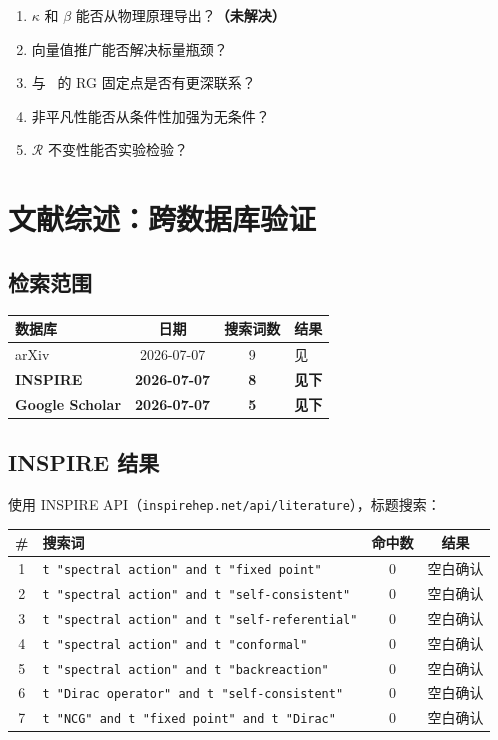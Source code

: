 \documentclass[11pt,a4paper]{ctexart}
\theoremstyle{remark}
\newcommand{\R}{\mathcal{R}}
\begin{document}
\begin{enumerate}
  \item $\kappa$ 和 $\beta$ 能否从物理原理导出？\textbf{（未解决）}
  \item 向量值推广能否解决标量瓶颈？
  \item 与~\cite{Per20} 的 RG 固定点是否有更深联系？
  \item 非平凡性能否从条件性加强为无条件？
  \item $\R$ 不变性能否实验检验？
\end{enumerate}

\section{文献综述：跨数据库验证}

\subsection{检索范围}

\begin{table}[h]
\centering
\begin{tabular}{lccl}
\toprule
数据库 & 日期 & 搜索词数 & 结果 \\
\midrule
arXiv & 2026-07-07 & 9 & 见~\cite{Phase1Report} \\
\textbf{INSPIRE} & \textbf{2026-07-07} & \textbf{8} & \textbf{见下} \\
\textbf{Google Scholar} & \textbf{2026-07-07} & \textbf{5} & \textbf{见下} \\
\bottomrule
\end{tabular}
\end{table}

\subsection{INSPIRE 结果}

使用 INSPIRE API（\texttt{inspirehep.net/api/literature}），标题搜索：

\begin{table}[h]
\centering
\begin{tabular}{clcc}
\toprule
\# & 搜索词 & 命中数 & 结果 \\
\midrule
1 & \texttt{t "spectral action" and t "fixed point"} & 0 & 空白确认 \\
2 & \texttt{t "spectral action" and t "self-consistent"} & 0 & 空白确认 \\
3 & \texttt{t "spectral action" and t "self-referential"} & 0 & 空白确认 \\
4 & \texttt{t "spectral action" and t "conformal"} & 0 & 空白确认 \\
5 & \texttt{t "spectral action" and t "backreaction"} & 0 & 空白确认 \\
6 & \texttt{t "Dirac operator" and t "self-consistent"} & 0 & 空白确认 \\
7 & \texttt{t "NCG" and t "fixed point" and t "Dirac"} & 0 & 空白确认 \\
\bottomrule
\end{tabular}
\end{table}
\end{document}
